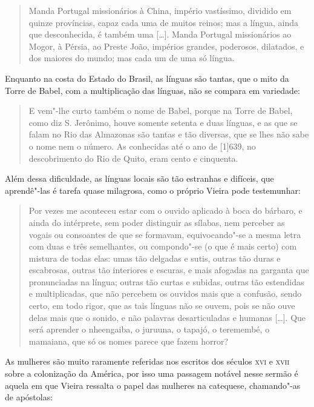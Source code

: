 \begin{quote}
Manda Portugal missionários à China, império vastíssimo, dividido em
quinze províncias, capaz cada uma de muitos reinos; mas a língua, ainda
que desconhecida, é também uma {[}\ldots{}{]}. Manda Portugal missionários ao
Mogor, à Pérsia, ao Preste João, impérios grandes, poderosos, dilatados,
e dos maiores do mundo; mas cada um de uma só língua.
\end{quote}

Enquanto na costa do Estado do Brasil, as línguas são tantas, que o mito
da Torre de Babel, com a multiplicação das línguas, não se compara em
variedade:

\begin{quote}
E vem"-lhe curto também o nome de Babel, porque na Torre de Babel, como
diz S. Jerônimo, houve somente setenta e duas línguas, e as que se falam
no Rio das Almazonas são tantas e tão diversas, que se lhes não sabe o
nome nem o número. As conhecidas até o ano de {[}1{]}639, no
descobrimento do Rio de Quito, eram cento e cinquenta.
\end{quote}

Além dessa dificuldade, as línguas locais são tão estranhas e difíceis,
que aprendê"-las é tarefa quase milagrosa, como o próprio Vieira pode
testemunhar:

\begin{quote}
Por vezes me aconteceu estar com o ouvido aplicado à boca do bárbaro,
e ainda do intérprete, sem poder distinguir as sílabas, nem perceber as
vogais ou consoantes de que se formavam, equivocando"-se a mesma letra
com duas e três semelhantes, ou compondo"-se (o que é mais certo) com
mistura de todas elas: umas tão delgadas e sutis, outras tão duras e
escabrosas, outras tão interiores e escuras, e mais afogadas na garganta
que pronunciadas na língua; outras tão curtas e subidas, outras tão
estendidas e multiplicadas, que não percebem os ouvidos mais que a
confusão, sendo certo, em todo rigor, que as tais línguas não se ouvem,
pois se não ouve delas mais que o sonido, e não palavras desarticuladas
e humanas {[}\ldots{}{]}. Que será aprender o nheengaiba, o juruuna, o
tapajó, o teremembé, o mamaiana, que só os nomes parece que fazem
horror?
\end{quote}

As mulheres são muito raramente referidas nos escritos dos séculos \textsc{xvi} e
\textsc{xvii} sobre a colonização da América, por isso uma passagem notável nesse
sermão é aquela em que Vieira ressalta o papel das mulheres na
catequese, chamando"-as de apóstolas:

